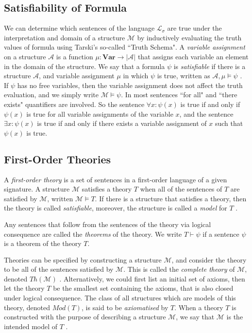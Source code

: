 \documentclass[11pt]{report}
\theoremstyle{definition}
\theoremstyle{theorem}
\theoremstyle{lemma}
\begin{document}
\subsection{Satisfiability of Formula}
We can determine which sentences of the language $\mathcal{L_\sigma}$ are true under the interpretation and domain of a structure $\mathcal{M}$ by inductively evaluating the truth values of formula using Tarski's so-called ``Truth Schema"\cite{tarski}.
A \emph{variable assignment} on a structure $\mathcal{A}$ is a function $\mu: \textbf{Var} \rightarrow |\mathcal{A}|$ that assigns each variable an element in the domain of the structure.
We say that a formula $\psi$ is \emph{satisfiable} if there is a structure $\mathcal A$, and variable assignment $\mu$ in which $\psi$ is true, written as $\mathcal{A}, \mu \vDash \psi$ \cite[ch.~2.3]{selinger}.\\

\noindent
If $\psi$ has no free variables, then the variable assignment does not affect the truth evaluation, and we simply write $\mathcal{M} \vDash \psi$.
In most sentences ``for all" and ``there exists" quantifiers are involved.
So the sentence $\forall x: \psi(x)$ is true if and only if $\psi(x)$ is true for all variable assignments of the variable $x$, and the sentence $\exists x: \psi(x)$ is true if and only if there exists a variable assignment of $x$ such that $\psi(x)$ is true.

\subsection{First-Order Theories}
A \emph{first-order theory} is a set of sentences in a first-order language of a given signature.
A structure $\mathcal M$ satisfies a theory $T$ when all of the sentences of $T$ are satisfied by $\mathcal{M}$, written $\mathcal{M} \vDash T$. If there is a structure that satisfies a theory, then the theory is called \emph{satisfiable}, moreover, the structure is called a \emph{model} for $T$ \cite[ch.~2.5]{selinger}.

Any sentences that follow from the sentences of the theory via logical consequence are called the \emph{theorems} of the theory. We write $T\vdash \psi$ if a sentence $\psi$ is a theorem of the theory $T$.

Theories can be specified by constructing a structure $\mathcal{M}$, and consider the theory to be all of the sentences satisfied by $\mathcal{M}$. This is called the \emph{complete theory} of $\mathcal{M}$, denoted $\mathit{Th}(\mathcal{M})$ \cite[ch.~1]{stanmodel}.
Alternatively, we could first list an initial set of axioms, then let the theory $T$ be the smallest set containing the axioms, that is also closed under logical consequence. The class of all structures which are models of this theory, denoted $\mathit{Mod(T)}$, is said to be \emph{axiomatised} by $T$.
When a theory $T$ is constructed with the purpose of describing a structure $\mathcal{M}$, we say that $\mathcal{M}$ is the intended model of $T$ \cite[ch.~2.2]{shortermodel}.
\end{document}
